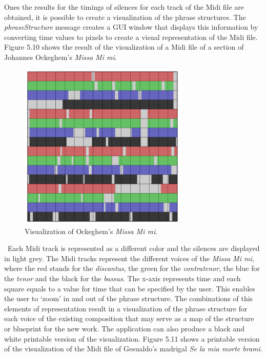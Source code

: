 Ones the results for the timings of silences for each track of the Midi file are obtained, it is possible to create a visualization of the phrase structures. The \emph{phraseStructure} message creates a GUI window that displays this information by converting time values to pixels to create a visual representation of the Midi file. Figure 5.10 shows the result of the visualization of a Midi file of a section of Johannes Ockeghem's \emph{Missa Mi mi}. 
\begin{figure}[htbp] %
   \centering
   \includegraphics[width=8cm]{chapter5/midi_phrase.tif} %
   \caption{Visualization of Ockeghem's \emph{Missa Mi mi}.}
   \label{fig:example}
\end{figure}\
Each Midi track is represented as a different color and the silences are displayed in light grey. The Midi tracks represent the different voices of the \emph{Missa Mi mi}, where the red stands for the \emph{discantus}, the green for the \emph{contratenor}, the blue for the \emph{tenor} and the black for the \emph{bassus}. The x-axis represents time and each square equals to a value for time that can be specified by the user. This enables the user to `zoom' in and out of the phrase structure. The combinations of this elements of representation result in a visualization of the phrase structure for each voice of the existing composition that may serve as a map of the structure or blueprint for the new work. The application can also produce a black and white printable version of the visualization. Figure 5.11 shows a printable version of the visualization of the Midi file of Gesualdo's madrigal \emph{Se la mia morte brami}. 
